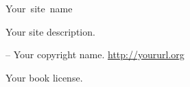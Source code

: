 \newpage
\thispagestyle{empty}

\begin{flushleft}\hbox{\Large{Your site name}}

Your site description.

\vfill
\copyleft  \the\year -- Your copyright name.
\url{http://yoururl.org}

Your book license.

\end{flushleft}
\newpage
